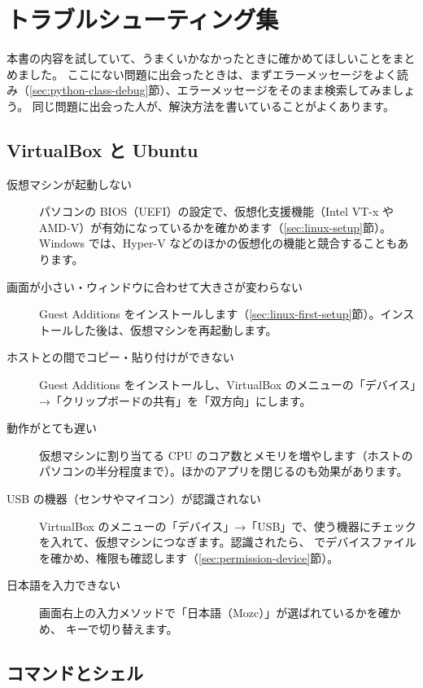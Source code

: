 \chapter{トラブルシューティング集}
\label{app:troubleshooting}

本書の内容を試していて、うまくいかなかったときに確かめてほしいことをまとめました。
ここにない問題に出会ったときは、まずエラーメッセージをよく読み（\ref{sec:python-class-debug}節）、エラーメッセージをそのまま検索してみましょう。
同じ問題に出会った人が、解決方法を書いていることがよくあります。

\section{VirtualBox と Ubuntu}
\label{sec:troubleshooting-vm}

\begin{description}
  \item[仮想マシンが起動しない] パソコンの BIOS（UEFI）の設定で、仮想化支援機能（Intel VT-x や AMD-V）が有効になっているかを確かめます（\ref{sec:linux-setup}節）。Windows では、Hyper-V などのほかの仮想化の機能と競合することもあります。
  \item[画面が小さい・ウィンドウに合わせて大きさが変わらない] Guest Additions をインストールします（\ref{sec:linux-first-setup}節）。インストールした後は、仮想マシンを再起動します。
  \item[ホストとの間でコピー・貼り付けができない] Guest Additions をインストールし、VirtualBox のメニューの「デバイス」→「クリップボードの共有」を「双方向」にします。
  \item[動作がとても遅い] 仮想マシンに割り当てる CPU のコア数とメモリを増やします（ホストのパソコンの半分程度まで）。ほかのアプリを閉じるのも効果があります。
  \item[USB の機器（センサやマイコン）が認識されない] VirtualBox のメニューの「デバイス」→「USB」で、使う機器にチェックを入れて、仮想マシンにつなぎます。認識されたら、 でデバイスファイルを確かめ、権限も確認します（\ref{sec:permission-device}節）。
  \item[日本語を入力できない] 画面右上の入力メソッドで「日本語（Mozc）」が選ばれているかを確かめ、 キーで切り替えます。
\end{description}

\section{コマンドとシェル}
\label{sec:troubleshooting-shell}

